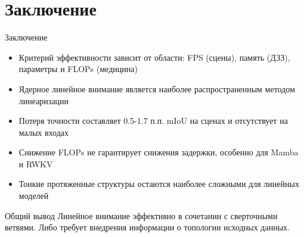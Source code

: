 \documentclass[10pt,aspectratio=169]{beamer}
\begin{document}
\section{Заключение}
\begin{frame}{Заключение}
  \begin{itemize}
    \item Критерий эффективности зависит от области: FPS (сцены), память (ДЗЗ), параметры и FLOPs (медицина)
    \item Ядерное линейное внимание является наиболее распространенным методом линеаризации
    \item Потеря точности составляет 0.5-1.7 п.п. mIoU на сценах и отсутствует на малых входах
    \item Снижение FLOPs не гарантирует снижения задержки, особенно для Mamba и RWKV
    \item Тонкие протяженные структуры остаются наиболее сложными для линейных моделей
  \end{itemize}
  \vspace{0.2cm}
  \begin{block}{Общий вывод}
    Линейное внимание эффективно в сочетании с сверточными ветвями. Либо требует внедрения информации о топологии исходных данных.
  \end{block}
\end{frame}

\begin{frame}[plain]
\end{frame}

\end{document}
